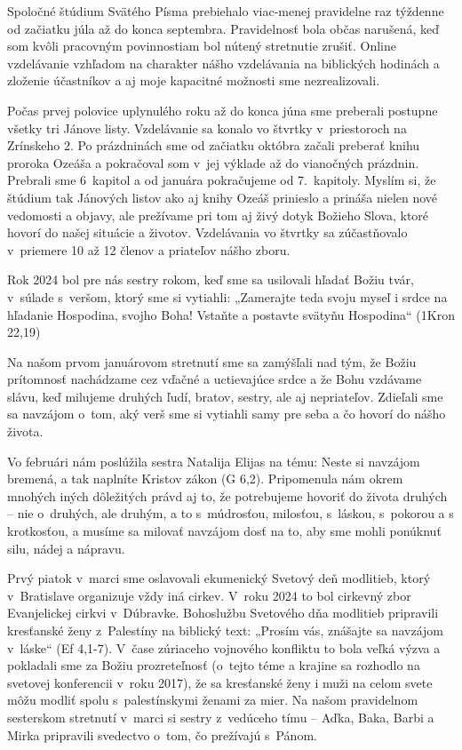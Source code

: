 Spoločné štúdium Svätého Písma prebiehalo viac-menej pravidelne raz týždenne od začiatku júla až do konca septembra. Pravidelnosť bola občas narušená, keď som kvôli pracovným povinnostiam bol nútený stretnutie zrušiť.
Online vzdelávanie vzhľadom na charakter nášho vzdelávania na biblických hodinách a zloženie účastníkov a aj moje kapacitné možnosti sme nezrealizovali.

Počas prvej polovice uplynulého roku až do konca júna sme preberali postupne všetky tri Jánove listy. Vzdelávanie sa konalo vo štvrtky v~priestoroch na Zrínskeho 2. Po prázdninách sme od začiatku októbra začali preberať knihu proroka Ozeáša a pokračoval som v~jej výklade až do vianočných prázdnin. Prebrali sme 6~kapitol a od januára pokračujeme od 7.~kapitoly. Myslím si, že štúdium tak Jánových listov ako aj knihy Ozeáš prinieslo a prináša nielen nové vedomosti a objavy, ale prežívame pri tom aj živý dotyk Božieho Slova, ktoré hovorí do našej situácie a životov. Vzdelávania vo štvrtky sa zúčastňovalo v~priemere 10 až 12 členov a priateľov nášho zboru.






Rok 2024 bol pre nás sestry rokom, keď sme sa usilovali hľadať Božiu tvár, v~súlade s~veršom, ktorý sme si vytiahli: „Zamerajte teda svoju myseľ i srdce na hľadanie Hospodina, svojho Boha! Vstaňte a postavte svätyňu Hospodina“ (1Kron 22,19)

Na našom prvom januárovom stretnutí sme sa zamýšľali nad tým, že Božiu prítomnosť nachádzame cez vďačné a uctievajúce srdce a že Bohu vzdávame slávu, keď milujeme druhých ľudí, bratov, sestry, ale aj nepriateľov. Zdieľali sme sa navzájom o~tom, aký verš sme si vytiahli samy pre seba a čo hovorí do nášho života.

Vo februári nám poslúžila sestra Natalija Elijas na tému: Neste si navzájom bremená, a tak naplníte Kristov zákon (G 6,2). Pripomenula nám okrem mnohých iných dôležitých právd aj to, že potrebujeme hovoriť do života druhých -- nie o~druhých, ale druhým, a to s~múdrosťou, milosťou, s~láskou, s~pokorou a s krotkosťou, a musíme sa milovať navzájom dosť na to, aby sme mohli ponúknuť silu, nádej a nápravu.

Prvý piatok v~marci sme oslavovali ekumenický Svetový deň modlitieb, ktorý v~Bratislave organizuje vždy iná cirkev. V~roku 2024 to bol cirkevný zbor Evanjelickej cirkvi v~Dúbravke. Bohoslužbu Svetového dňa modlitieb pripravili kresťanské ženy z~Palestíny na biblický text: „Prosím vás, znášajte sa navzájom v~láske“ (Ef 4,1-7). V~čase zúriaceho vojnového konfliktu to bola veľká výzva a pokladali sme za Božiu prozreteľnosť (o~tejto téme a krajine sa rozhodlo na svetovej konferencii v~roku 2017), že sa kresťanské ženy i muži na celom svete môžu modliť spolu s~palestínskymi ženami za mier.
Na našom pravidelnom sesterskom stretnutí v~marci si sestry z~vedúceho tímu -- Aďka, Baka, Barbi a Mirka pripravili svedectvo o~tom, čo prežívajú s~Pánom.

